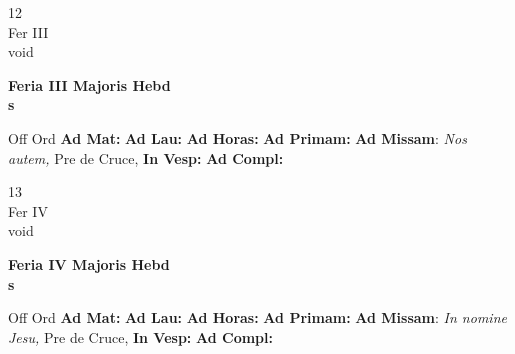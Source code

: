 \documentclass[10pt, openany]{book}
\begin{document}
    \begin{center}
        \begin{minipage}{3.5in}
            \vspace{2em}
            \begin{minipage}{0.5in}
                {\Huge 12} \\
                {\normalsize Fer III} \\
                {\normalsize void}
            \end{minipage}
            \begin{minipage}{3.0in}
                \textbf{ \large Feria III Majoris Hebd \\
                \textnormal{\normalsize s}} \\ 
            \end{minipage}
            \begin{justify}Off Ord
                \textbf{Ad Mat: }
                \textbf{Ad Lau: }
                \textbf{Ad Horas: }
                \textbf{Ad Primam: }\textbf{Ad Missam}: \textit{Nos autem,} Pre de Cruce,  
                \textbf{In Vesp: }
                \textbf{Ad Compl: }
            \end{justify}
        \end{minipage}
    \end{center}

    \begin{center}
        \begin{minipage}{3.5in}
            \vspace{2em}
            \begin{minipage}{0.5in}
                {\Huge 13} \\
                {\normalsize Fer IV} \\
                {\normalsize void}
            \end{minipage}
            \begin{minipage}{3.0in}
                \textbf{ \large Feria IV Majoris Hebd \\
                \textnormal{\normalsize s}} \\ 
            \end{minipage}
            \begin{justify}Off Ord
                \textbf{Ad Mat: }
                \textbf{Ad Lau: }
                \textbf{Ad Horas: }
                \textbf{Ad Primam: }\textbf{Ad Missam}: \textit{In nomine Jesu,} Pre de Cruce,  
                \textbf{In Vesp: }
                \textbf{Ad Compl: }
            \end{justify}
        \end{minipage}
    \end{center}
\end{document}
